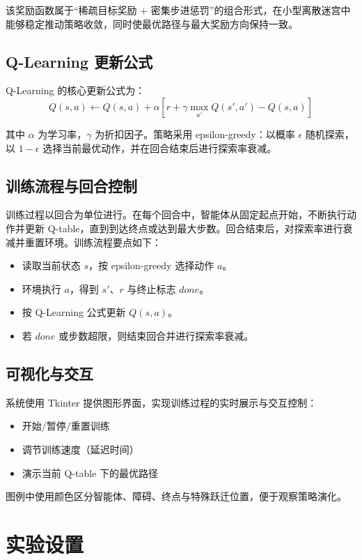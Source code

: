 \documentclass[UTF8, a4paper, 12pt]{ctexart}
\begin{document}
该奖励函数属于“稀疏目标奖励 + 密集步进惩罚”的组合形式，在小型离散迷宫中能够稳定推动策略收敛，同时使最优路径与最大奖励方向保持一致。

\subsection{Q-Learning 更新公式}

Q-Learning 的核心更新公式为：
\begin{equation}
Q(s,a) \leftarrow Q(s,a) + \alpha \left[r + \gamma \max_{a'} Q(s',a') - Q(s,a)\right]
\end{equation}

其中 $\alpha$ 为学习率，$\gamma$ 为折扣因子。策略采用 epsilon-greedy：以概率 $\epsilon$ 随机探索，以 $1-\epsilon$ 选择当前最优动作，并在回合结束后进行探索率衰减。

\subsection{训练流程与回合控制}

训练过程以回合为单位进行。在每个回合中，智能体从固定起点开始，不断执行动作并更新 Q-table，直到到达终点或达到最大步数。回合结束后，对探索率进行衰减并重置环境。训练流程要点如下：
\begin{itemize}
  \item 读取当前状态 $s$，按 epsilon-greedy 选择动作 $a$。
  \item 环境执行 $a$，得到 $s'$、$r$ 与终止标志 $done$。
  \item 按 Q-Learning 公式更新 $Q(s,a)$。
  \item 若 $done$ 或步数超限，则结束回合并进行探索率衰减。
\end{itemize}

\subsection{可视化与交互}

系统使用 Tkinter 提供图形界面，实现训练过程的实时展示与交互控制：
\begin{itemize}
  \item 开始/暂停/重置训练
  \item 调节训练速度（延迟时间）
  \item 演示当前 Q-table 下的最优路径
\end{itemize}

图例中使用颜色区分智能体、障碍、终点与特殊跃迁位置，便于观察策略演化。

\section{实验设置}
\end{document}
